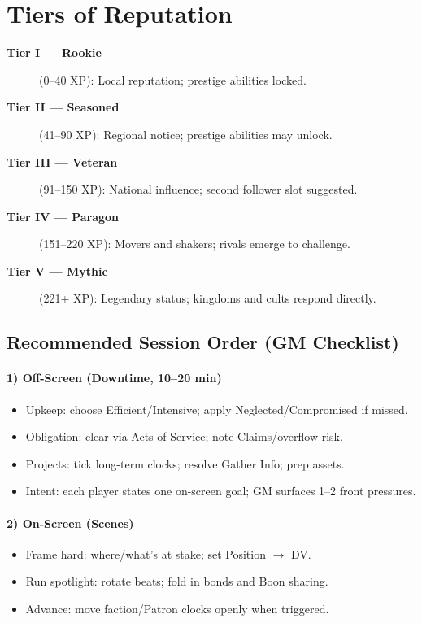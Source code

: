 \section{Tiers of Reputation}
\label{sec:reputation-tiers}

\begin{description}
\item[\textbf{Tier I — Rookie}] (0–40 XP): Local reputation; prestige abilities locked. 
\item[\textbf{Tier II — Seasoned}] (41–90 XP): Regional notice; prestige abilities may unlock. 
\item[\textbf{Tier III — Veteran}] (91–150 XP): National influence; second follower slot suggested. 
\item[\textbf{Tier IV — Paragon}] (151–220 XP): Movers and shakers; rivals emerge to challenge. 
\item[\textbf{Tier V — Mythic}] (221+ XP): Legendary status; kingdoms and cults respond directly. 
\end{description}

\subsection{Recommended Session Order (GM Checklist)}

\paragraph{1) Off-Screen (Downtime, 10–20 min)}
\begin{itemize}
  \item Upkeep: choose Efficient/Intensive; apply Neglected/Compromised if missed.
  \item Obligation: clear via Acts of Service; note Claims/overflow risk.
  \item Projects: tick long-term clocks; resolve Gather Info; prep assets.
  \item Intent: each player states one on-screen goal; GM surfaces 1–2 front pressures.
\end{itemize}

\paragraph{2) On-Screen (Scenes)}
\begin{itemize}
  \item Frame hard: where/what’s at stake; set Position $\to$ DV.
  \item Run spotlight: rotate beats; fold in bonds and Boon sharing.
  \item Advance: move faction/Patron clocks openly when triggered.
\end{itemize}

